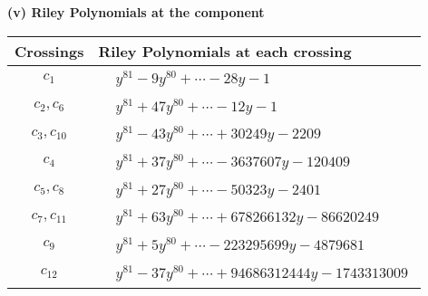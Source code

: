 \documentclass[1p]{elsarticle_modified}
\theoremstyle{definition}
\begin{document}
\newpage\renewcommand{\arraystretch}{1}
\flushleft \textbf{(v) Riley Polynomials at the component}\newline \\
\begin{tabular}{m{50pt}|m{274pt}}
Crossings & \hspace{64pt}Riley Polynomials at each crossing \\
\hline $$\begin{aligned}c_{1}\end{aligned}$$&$\begin{aligned}
&y^{81}-9 y^{80}+\cdots-28 y-1
\end{aligned}$\\
\hline $$\begin{aligned}c_{2},c_{6}\end{aligned}$$&$\begin{aligned}
&y^{81}+47 y^{80}+\cdots-12 y-1
\end{aligned}$\\
\hline $$\begin{aligned}c_{3},c_{10}\end{aligned}$$&$\begin{aligned}
&y^{81}-43 y^{80}+\cdots+30249 y-2209
\end{aligned}$\\
\hline $$\begin{aligned}c_{4}\end{aligned}$$&$\begin{aligned}
&y^{81}+37 y^{80}+\cdots-3637607 y-120409
\end{aligned}$\\
\hline $$\begin{aligned}c_{5},c_{8}\end{aligned}$$&$\begin{aligned}
&y^{81}+27 y^{80}+\cdots-50323 y-2401
\end{aligned}$\\
\hline $$\begin{aligned}c_{7},c_{11}\end{aligned}$$&$\begin{aligned}
&y^{81}+63 y^{80}+\cdots+678266132 y-86620249
\end{aligned}$\\
\hline $$\begin{aligned}c_{9}\end{aligned}$$&$\begin{aligned}
&y^{81}+5 y^{80}+\cdots-223295699 y-4879681
\end{aligned}$\\
\hline $$\begin{aligned}c_{12}\end{aligned}$$&$\begin{aligned}
&y^{81}-37 y^{80}+\cdots+94686312444 y-1743313009
\end{aligned}$\\
\hline
\end{tabular}\\~\\
\end{document}
